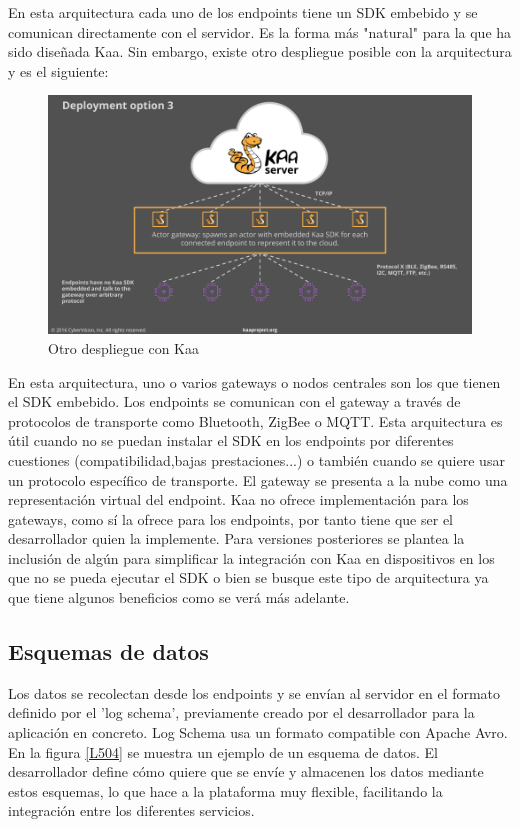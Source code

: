\documentclass[12pt, twoside]{book}
\newcommand{\MYhref}[3][blue]{\href{#2}{\color{#1}{#3}}}
\begin{document}
En esta arquitectura cada uno de los endpoints tiene un SDK embebido y se comunican directamente con el servidor. Es la forma más "natural" para la que ha sido diseñada Kaa. Sin embargo, existe otro despliegue posible con la arquitectura y es el siguiente:
\begin{figure}[H]
\centering
\includegraphics[scale=0.4]{images/deployment2}
\caption{Otro despliegue con Kaa}\label{L502}
\end{figure} 
En esta arquitectura, uno o varios gateways o nodos centrales son los que tienen el SDK embebido. Los endpoints se comunican con el gateway a través de protocolos de transporte como Bluetooth, ZigBee o MQTT. Esta arquitectura es útil cuando no se puedan instalar el SDK en los endpoints por diferentes cuestiones (compatibilidad,bajas prestaciones...) o también cuando se quiere usar un protocolo específico de transporte. El gateway se presenta a la nube como una representación virtual del endpoint. Kaa no ofrece implementación para los gateways, como sí la ofrece para los endpoints, por tanto tiene que ser el desarrollador quien la implemente. Para versiones posteriores se plantea la inclusión de algún \MYhref{framework}{http://jira.kaaproject.org/browse/KAA-752} para simplificar la integración con Kaa en dispositivos en los que no se pueda ejecutar el SDK  o bien se busque este tipo de arquitectura ya que tiene algunos beneficios como se verá más adelante.





\subsection*{Esquemas de datos}
Los datos se recolectan desde los endpoints y se envían al servidor en el formato definido por el 'log schema', previamente creado por el desarrollador para la aplicación en concreto. Log Schema usa un formato compatible con Apache Avro. En la figura \ref{L504} se muestra un ejemplo de un esquema de datos. El desarrollador define cómo quiere que se envíe y almacenen los datos mediante estos esquemas, lo que hace a la plataforma muy flexible, facilitando la integración entre los diferentes servicios.\\
 
\end{document}
